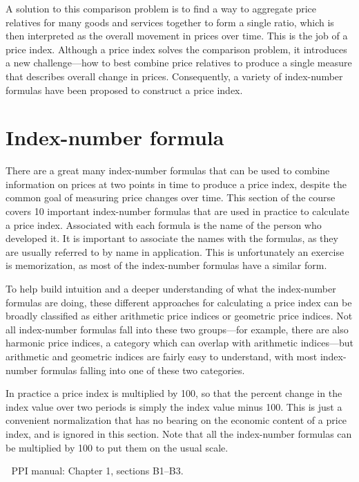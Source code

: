 \documentclass[]{article}
\begin{document}
A solution to this comparison problem is to find a way to aggregate price relatives for many goods and services together to form a single ratio, which is then interpreted as the overall movement in prices over time. This is the job of a price index. Although a price index solves the comparison problem, it introduces a new challenge---how to best combine price relatives to produce a single measure that describes overall change in prices. Consequently, a variety of index-number formulas have been proposed to construct a price index.

\hypertarget{index-number-formula}{%
\section{Index-number formula}\label{index-number-formula}}

There are a great many index-number formulas that can be used to combine information on prices at two points in time to produce a price index, despite the common goal of measuring price changes over time. This section of the course covers 10 important index-number formulas that are used in practice to calculate a price index. Associated with each formula is the name of the person who developed it. It is important to associate the names with the formulas, as they are usually referred to by name in application. This is unfortunately an exercise is memorization, as most of the index-number formulas have a similar form.

To help build intuition and a deeper understanding of what the index-number formulas are doing, these different approaches for calculating a price index can be broadly classified as either arithmetic price indices or geometric price indices. Not all index-number formulas fall into these two groups---for example, there are also harmonic price indices, a category which can overlap with arithmetic indices---but arithmetic and geometric indices are fairly easy to understand, with most index-number formulas falling into one of these two categories.

In practice a price index is multiplied by 100, so that the percent change in the index value over two periods is simply the index value minus 100. This is just a convenient normalization that has no bearing on the economic content of a price index, and is ignored in this section. Note that all the index-number formulas can be multiplied by 100 to put them on the usual scale.

📖 PPI manual: Chapter 1, sections B1--B3.
\end{document}
